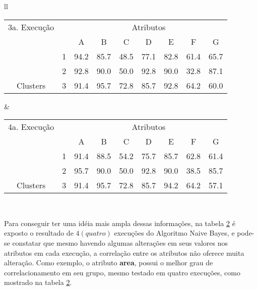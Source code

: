 \begin{table}[!h]
\begin{tabular}{ll}
   \small\addtolength{\tabcolsep}{-5pt}
   \begin{tabular}{|cl|c|c|c|c|c|c|c|}
        \hline \hline
          {\tiny 3a. Execução}     &   & \multicolumn{7}{c|}{Atributos}                                               \\ \cline{3-9} 
       \multicolumn{1}{|l}{}                            &   & A    & B & C & D & E & F & G \\ \hline
        \multicolumn{1}{|c|}{}                           & 1 & 94.2 & 85.7   & 48.5      & 77.1 & 82.8 & 61.4   & 65.7   \\ \cline{2-9} 
        \multicolumn{1}{|c|}{}                           & 2 & 92.8 & 90.0   & 50.0      & 92.8 & 90.0 & 32.8  & 87.1  \\ \cline{2-9} 
        \multicolumn{1}{|c|}{\multirow{-3}{*}{Clusters}} & 3 & 91.4 & 95.7   & 72.8      & 85.7 & 92.8 & 64.2  & 60.0  \\ \hline
   \end{tabular}
    
    &
    
       \small\addtolength{\tabcolsep}{-5pt}
   \begin{tabular}{|cl|c|c|c|c|c|c|c|}
        \hline \hline
            {\tiny 4a. Execução }   &   & \multicolumn{7}{c|}{Atributos}                                               \\ \cline{3-9} 
       \multicolumn{1}{|l}{}                            &   & A    & B & C & D & E & F & G \\ \hline
        \multicolumn{1}{|c|}{}                           & 1 & 91.4 & 88.5   & 54.2      & 75.7 & 85.7 & 62.8   & 61.4   \\ \cline{2-9} 
        \multicolumn{1}{|c|}{}                           & 2 & 95.7 & 90.0   & 50.0      & 92.8 & 90.0 & 38.5  & 85.7  \\ \cline{2-9} 
        \multicolumn{1}{|c|}{\multirow{-3}{*}{Clusters}} & 3 & 91.4 & 95.7   & 72.8      & 85.7 & 94.2 & 64.2  & 57.1  \\ \hline
   \end{tabular}
   \\
 
 \end{tabular}
 \label{tab:execucoes:seed:nb}
\end{table}

Para conseguir ter uma idéia mais ampla dessas informações, na tabela \ref{tab:execucoes:seed:nb} é exposto o resultado de ${4(quatro)}$ execuções do Algoritmo Naive Bayes, e pode-se constatar que mesmo havendo algumas alterações em seus valores nos atributos em cada execução, a correlação entre os atributos não oferece muita alteração. Como exemplo, o atributo \textbf{area}, possui o melhor grau de correlacionamento em seu grupo, mesmo testado em quatro execuções, como mostrado na tabela \ref{tab:execucoes:seed:nb}.

